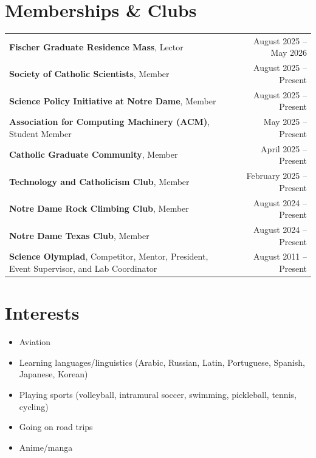 \documentclass[letterpaper,11pt]{article}
\begin{document}
\section{Memberships \& Clubs}
  \begin{small}
    \begin{tabularx}{\textwidth}{@{} X r @{}}
      \textbf{Fischer Graduate Residence Mass}, Lector & August 2025 -- May 2026 \\
      \textbf{Society of Catholic Scientists}, Member & August 2025 -- Present \\
      \textbf{Science Policy Initiative at Notre Dame}, Member & August 2025 -- Present \\
      \textbf{Association for Computing Machinery (ACM)}, Student Member & May 2025 -- Present \\
      \textbf{Catholic Graduate Community}, Member & April 2025 -- Present \\
      \textbf{Technology and Catholicism Club}, Member & February 2025 -- Present \\
      \textbf{Notre Dame Rock Climbing Club}, Member & August 2024 -- Present \\
      \textbf{Notre Dame Texas Club}, Member & August 2024 -- Present \\
      \textbf{Science Olympiad}, Competitor, Mentor, President, Event Supervisor, and Lab Coordinator & August 2011 -- Present \\
    \end{tabularx}
  \end{small}

\section{Interests}
  \begin{small}
    \begin{itemize}
      \item Aviation
      \item Learning languages/linguistics (Arabic, Russian, Latin, Portuguese, Spanish, Japanese, Korean)
      \item Playing sports (volleyball, intramural soccer, swimming, pickleball, tennis, cycling)
      \item Going on road trips
      \item Anime/manga
    \end{itemize}
  \end{small}
\end{document}
